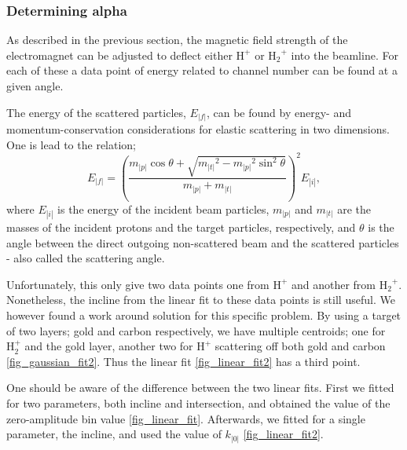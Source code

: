  
\subsubsection{Determining alpha}
As described in the previous section, the magnetic field strength of the
electromagnet can be adjusted to deflect either $\mathrm{H^+}$ or
$\mathrm{{H_2}^+}$ into the beamline. For each of these a data point of energy
related to channel number can be found at a given angle.

The energy of the scattered particles, $E_|f|$, can be found by energy- and
momentum-conservation considerations for elastic scattering in two dimensions.
One is lead to the relation;
\begin{equation}
E_|f| = \left( \frac{m_|p| \cos\theta + \sqrt{{m_|t|}^2 - {m_|p|}^2
\sin^2\theta}}{m_|p|+m_|t|} \right)^2 E_|i|,
\label{eq_5}
\end{equation}
where $E_|i|$ is the energy of the incident beam particles, $m_|p|$ and $m_|t|$ are
the masses of the incident protons and the target particles, respectively, and
$\theta$ is the angle between the direct outgoing non-scattered beam and the
scattered particles - also called the scattering angle.

Unfortunately, this only give two data points one from $\mathrm{H^+}$ and
another from $\mathrm{{H_2}^+}$. Nonetheless, the incline from the linear fit
to these data points is still useful. We however found a work around solution
for this specific problem. By using a target of two layers; gold and carbon
respectively, we have multiple centroids; one for $\mathrm{H_2^+}$ and the gold
layer, another two for $\mathrm{H^+}$
scattering off both gold and carbon \cref{fig_gaussian_fit2}. Thus the linear fit
\cref{fig_linear_fit2} has a third point.

One should be aware of the difference between the two linear fits. First we
fitted for two parameters, both incline and intersection, and obtained the
value of the zero-amplitude bin value \cref{fig_linear_fit}. Afterwards, we fitted for a single
parameter, the incline, and used the value of $k_|0|$ \cref{fig_linear_fit2}.

